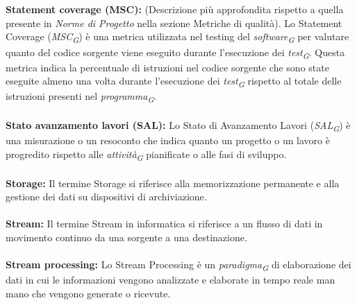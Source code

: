 \documentclass{article}
\begin{document}
\\
\\
\textbf{Statement coverage (MSC):} (Descrizione più approfondita rispetto a quella presente in \textit{Norme di Progetto} nella sezione Metriche di qualità). Lo Statement Coverage (\textit{MSC}\textsubscript{\textit{G}}) è una metrica utilizzata nel testing del \textit{software}\textsubscript{\textit{G}} per valutare quanto del codice sorgente viene eseguito durante l'esecuzione dei \textit{test}\textsubscript{\textit{G}}.
Questa metrica indica la percentuale di istruzioni nel codice sorgente che sono state eseguite almeno una volta durante l'esecuzione dei \textit{test}\textsubscript{\textit{G}} rispetto al totale delle istruzioni presenti nel \textit{programma}\textsubscript{\textit{G}}. 
\\
\\
\textbf{Stato avanzamento lavori (SAL):} Lo Stato di Avanzamento Lavori (\textit{SAL}\textsubscript{\textit{G}}) è una misurazione o un resoconto che indica quanto un progetto o un lavoro è progredito rispetto alle \textit{attività}\textsubscript{\textit{G}} pianificate o alle fasi di sviluppo.
\\
\\
\textbf{Storage:} Il termine Storage si riferisce alla memorizzazione permanente e alla gestione dei dati su dispositivi di archiviazione.
\\
\\
\textbf{Stream:} Il termine Stream in informatica si riferisce a un flusso di dati in movimento continuo da una sorgente a una destinazione.
\\
\\
\textbf{Stream processing:} Lo Stream Processing è un \textit{paradigma}\textsubscript{\textit{G}} di elaborazione dei dati in cui le informazioni vengono analizzate e elaborate in tempo reale man mano che vengono generate o ricevute.
\pagebreak
\end{document}

